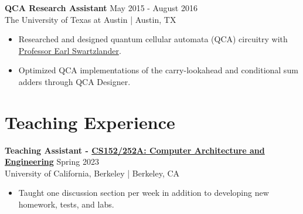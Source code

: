 \documentclass[line]{res}
\begin{document}
\begin{resume}
\textbf{QCA Research Assistant} \hfill May 2015 - August 2016
\\
The University of Texas at Austin | Austin, TX
\\
\vspace{-3mm}
\begin{itemize}
\item Researched and designed quantum cellular automata (QCA) circuitry with \href{https://www.ece.utexas.edu/people/faculty/earl-swartzlander}{Professor Earl Swartzlander}.
\item Optimized QCA implementations of the carry-lookahead and conditional sum adders through QCA Designer.
\end{itemize}


\section{\Large{Teaching Experience}}
\label{sec:teaching}
\vspace{2mm}

\textbf{Teaching Assistant - \href{https://inst.eecs.berkeley.edu/~cs152/sp23/}{CS152/252A: Computer Architecture and Engineering}} \hfill Spring 2023
\\
University of California, Berkeley | Berkeley, CA
\\
\vspace{-3mm}
\begin{itemize}
\item Taught one discussion section per week in addition to developing new homework, tests, and labs.
\end{itemize}


\end{resume}
\end{document}

